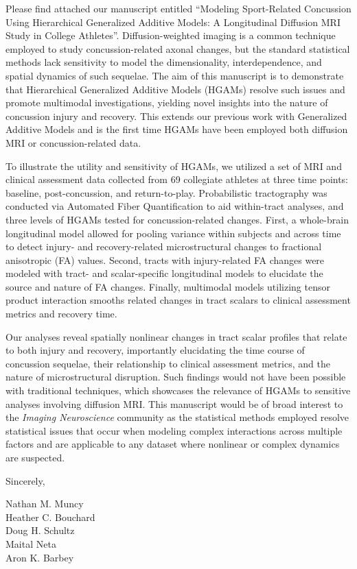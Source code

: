 \documentclass{article}
\begin{document}
Please find attached our manuscript entitled ``Modeling Sport-Related Concussion Using Hierarchical Generalized Additive Models: A Longitudinal Diffusion MRI Study in College Athletes''. Diffusion-weighted imaging is a common technique employed to study concussion-related axonal changes, but the standard statistical methods lack sensitivity to model the dimensionality, interdependence, and spatial dynamics of such sequelae. The aim of this manuscript is to demonstrate that Hierarchical Generalized Additive Models (HGAMs) resolve such issues and promote multimodal investigations, yielding novel insights into the nature of concussion injury and recovery. This extends our previous work with Generalized Additive Models and is the first time HGAMs have been employed both diffusion MRI or concussion-related data.

To illustrate the utility and sensitivity of HGAMs, we utilized a set of MRI and clinical assessment data collected from 69 collegiate athletes at three time points: baseline, post-concussion, and return-to-play. Probabilistic tractography was conducted via Automated Fiber Quantification to aid within-tract analyses, and three levels of HGAMs tested for concussion-related changes. First, a whole-brain longitudinal model allowed for pooling variance within subjects and across time to detect injury- and recovery-related microstructural changes to fractional anisotropic (FA) values. Second, tracts with injury-related FA changes were modeled with tract- and scalar-specific longitudinal models to elucidate the source and nature of FA changes. Finally, multimodal models utilizing tensor product interaction smooths related changes in tract scalars to clinical assessment metrics and recovery time.

Our analyses reveal spatially nonlinear changes in tract scalar profiles that relate to both injury and recovery, importantly elucidating the time course of concussion sequelae, their relationship to clinical assessment metrics, and the nature of microstructural disruption. Such findings would not have been possible with traditional techniques, which showcases the relevance of HGAMs to sensitive analyses involving diffusion MRI. This manuscript would be of broad interest to the \textit{Imaging Neuroscience} community as the statistical methods employed resolve statistical issues that occur when modeling complex interactions across multiple factors and are applicable to any dataset where nonlinear or complex dynamics are suspected.

\par\vspace{2ex}
Sincerely,

\bigskip\bigskip

Nathan M. Muncy\\
Heather C. Bouchard\\
Doug H. Schultz\\
Maital Neta\\
Aron K. Barbey
\end{document}
